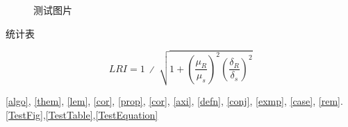 \documentclass[type=bachelor]{bithesis}
\begin{document}
\begin{figure}[htbp]
  \caption{测试图片}\label{TestFig}
\end{figure}
\begin{table}[htbp]
  \caption{统计表}\label{TestTable}
\end{table}
\begin{equation}
  LRI=1\ ∕\ \sqrt{1+{\left(\frac{{\mu }_{R}}{{\mu }_{s}}\right)}^{2}{\left(\frac{{\delta }_{R}}{{\delta }_{s}}\right)}^{2}}
  \label{TestEquation}
\end{equation}



\autoref{algo}, \autoref{them}, \autoref{lem}, \autoref{cor}, \autoref{prop}, \autoref{cor}, \autoref{axi}, \autoref{defn}, \autoref{conj}, \autoref{exmp}, \autoref{case}, \autoref{rem}.
\autoref{TestFig},\autoref{TestTable},\autoref{TestEquation}
\end{document}
